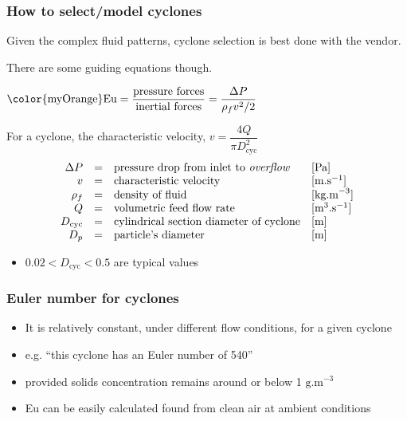 \begin{frame}\frametitle{How to select/model cyclones}
	{\color{myOrange}Given the complex fluid patterns, cyclone selection is best done with the vendor.}
	
	\vspace{12pt}
	There are some guiding equations though.
	\begin{exampleblock}{}
		$\text{{\color{myOrange}Eu}} = \dfrac{\text{pressure forces}}{\text{inertial forces}} = \dfrac{\Delta P}{\rho_f v^2 / 2}$
	\end{exampleblock}
	
	\vspace{12pt}
	For a cyclone, the characteristic velocity, $v = \dfrac{4Q}{\pi D_\text{cyc}^2}$
	\[
		\begin{array}{rcll}
			\Delta P&=& \text{pressure drop from inlet to \emph{overflow}} 	&[\text{Pa}]\\
			v 	    &=& \text{characteristic velocity}                     	&[\text{m.s}^{-1}]\\
			\rho_f  &=& \text{density of fluid}  							&[\text{kg.m}^{-3}]\\
			Q   	&=& \text{volumetric feed flow rate}					&[\text{m}^{3}\text{.s}^{-1}]\\
			D_\text{cyc}&=& \text{cylindrical section diameter of cyclone}	&[\text{m}] \\
			D_p 	&=& \text{particle's diameter} &[\text{m}]
		\end{array}
	\]
	\begin{itemize}
		\item	$0.02 < D_\text{cyc} <  0.5$ are typical values
	\end{itemize}
\end{frame}

\begin{frame}\frametitle{{\color{myOrange}Eu}ler number for cyclones}
	\begin{itemize}
		\item	It is relatively constant, under different flow conditions, for a given cyclone
		\item	e.g. ``this cyclone has an Euler number of 540''

		\item	provided solids concentration remains around or below 1 $\text{g.m}^{-3}$  %
		\item	{\color{myOrange}Eu} can be easily calculated found from clean air at ambient conditions 
	\end{itemize}
\end{frame}


